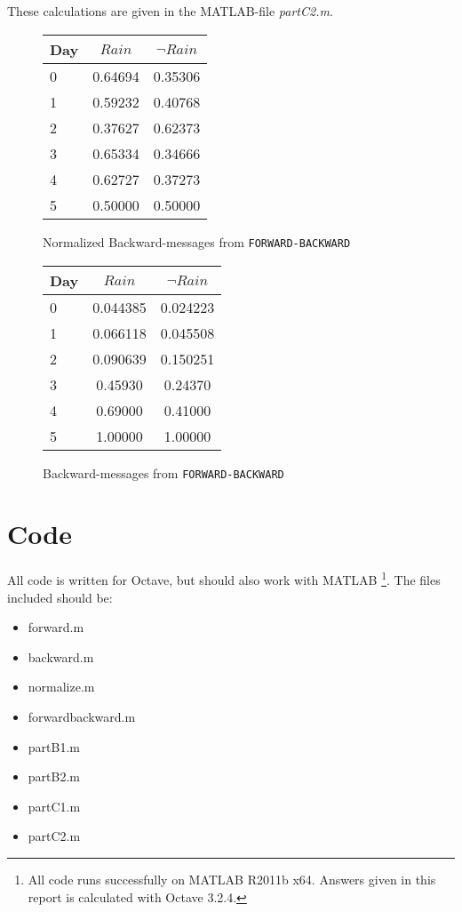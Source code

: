 \documentclass[english]{article}
\begin{document}
\subsection{}
These calculations are given in the MATLAB-file \emph{partC2.m}.
\begin{figure}[h]
\begin{tabular}{|l||c|c|}
\hline
Day & \(Rain\) & \(\lnot Rain\) \\
\hline
\hline
0 & 0.64694 & 0.35306\\
1 & 0.59232 & 0.40768\\
2 & 0.37627 & 0.62373\\
3 & 0.65334 & 0.34666\\
4 & 0.62727 & 0.37273\\
5 & 0.50000 & 0.50000\\
\hline
\end{tabular}
\caption{Normalized Backward-messages from \texttt{FORWARD-BACKWARD}}
\end{figure}
\begin{figure}[h]
\begin{tabular}{|l||c|c|}
\hline
Day & \(Rain\) & \(\lnot Rain\) \\
\hline
\hline
0 & 0.044385 & 0.024223\\
1 & 0.066118 & 0.045508\\
2 & 0.090639 & 0.150251\\
3 & 0.45930 & 0.24370\\
4 & 0.69000 & 0.41000\\
5 & 1.00000 & 1.00000\\
\hline
\end{tabular}
\caption{Backward-messages from \texttt{FORWARD-BACKWARD}}
\end{figure}

\newpage
\section{Code}
All code is written for Octave, but should also work with MATLAB
\footnote{All code runs successfully on MATLAB R2011b x64. Answers
given in this report is calculated with Octave 3.2.4.}.
The files included should be:
\begin{itemize}
  \item forward.m
  \item backward.m
  \item normalize.m
  \item forwardbackward.m
  \item partB1.m
  \item partB2.m
  \item partC1.m
  \item partC2.m
\end{itemize}
\end{document}
